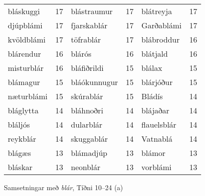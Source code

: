 \documentclass[../samsetningasafn.tex]{subfiles}
\begin{document}
\begin{wordlist}[H]
\begin{tcolorbox}
\begin{tabular}{BlBlBl}
		bláskuggi	& 17		& 	
		blástraumur	& 17		& 	
		blátreyja	& 17		\\ 	%
		djúpblámi	& 17		& 	
		fjarskablár	& 17		& 	
		Garðablámi	& 17		\\  %
		kvöldblámi	& 17		& 	
		töfrablár		& 17		& 	
		blábroddur	& 16		\\  %
		blárendur	& 16		& 	
		blárós		& 16		& 	
		blátjald		& 16		\\  %
		misturblár	& 16		& 	
		bláfiðrildi	& 15		& 		
		blálax		& 15		\\ 	%
		blámagur	& 15		& 	
		bláókunnugur & 15		& 	
		blárjóður	& 15		\\ 	%
		næturblámi	& 15		& 	
		skúrablár	& 15		& 	
		Bládís		& 14		\\ 	%
		bláglytta	& 14		& 	
		bláhnoðri	& 14		& 		
		blájaðar		& 14		\\ 	%
		bláljós		& 14		& 	
		dularblár	& 14		& 	
		flauelsblár	& 14		\\ 	 %
		reykblár		& 14		& 
		skuggablár	& 14		& 	
		Vatnablá	& 14		\\ 	%
		blágæs		& 13		& 	
		blámadjúp	& 13		& 	
		blámor		& 13		\\ 	%
		bláskar		& 13		& 		
		neonblár	& 13		& 	
		vorblámi		& 13		 	%
	\end{tabular}

\end{tcolorbox}
	\caption{Samsetningar með \textit{blár}, Tíðni 10--24 (a)}
	\label{listi:blatt.10a}
\end{wordlist}	
		
\end{document}
